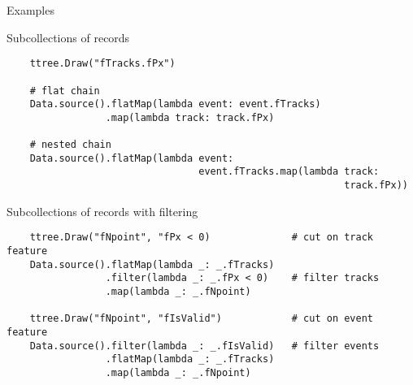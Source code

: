 \documentclass{beamer}
\begin{document}
\begin{frame}[fragile]{Examples}
\begin{block}{Subcollections of records}
\vspace{-0.5\baselineskip}
{\scriptsize \begin{verbatim}
    ttree.Draw("fTracks.fPx")

    # flat chain
    Data.source().flatMap(lambda event: event.fTracks)
                 .map(lambda track: track.fPx)

    # nested chain
    Data.source().flatMap(lambda event:
                                 event.fTracks.map(lambda track:
                                                          track.fPx))
\end{verbatim}}
\vspace{-0.5\baselineskip}
\end{block}

\begin{block}{Subcollections of records with filtering}
\vspace{-0.5\baselineskip}
{\scriptsize \begin{verbatim}
    ttree.Draw("fNpoint", "fPx < 0)              # cut on track feature
    Data.source().flatMap(lambda _: _.fTracks)
                 .filter(lambda _: _.fPx < 0)    # filter tracks
                 .map(lambda _: _.fNpoint)

    ttree.Draw("fNpoint", "fIsValid")            # cut on event feature
    Data.source().filter(lambda _: _.fIsValid)   # filter events
                 .flatMap(lambda _: _.fTracks)
                 .map(lambda _: _.fNpoint)
\end{verbatim}}
\vspace{-0.5\baselineskip}
\end{block}
\end{frame}
\end{document}
